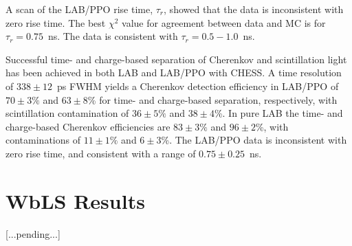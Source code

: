 A scan of the LAB/PPO rise time, $\tau_r$, showed that the data is inconsistent with zero rise time.  The best $\chi^2$ value for  agreement between data and MC is for $\tau_r=0.75$~ns. The data is consistent with $\tau_r=0.5-1.0$~ns.


Successful  time- and charge-based separation of Cherenkov and scintillation light has been achieved in both LAB and LAB/PPO with CHESS. 
A time resolution of $338\pm12$~ps FWHM yields a Cherenkov detection efficiency in LAB/PPO of  
$70 \pm 3 \%$ and $63\pm8$\% for time- and charge-based separation, respectively, with scintillation contamination of  $36\pm5\%$ and $38\pm4$\%.  In pure LAB the time- and charge-based Cherenkov efficiencies are $83\pm3\%$ and $96\pm2$\%, with contaminations of $11\pm1\%$ and $6\pm3$\%.
The LAB/PPO  data  is  inconsistent with zero rise time, and consistent with a range of $0.75\pm0.25$~ns.  


\section{WbLS Results}
\label{sec:wbls}
[...pending...]
